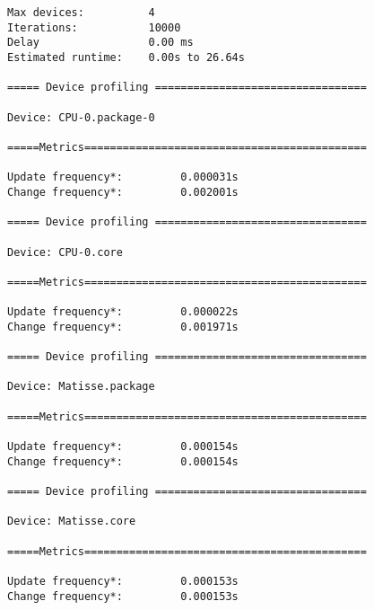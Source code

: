 \begin{verbatim}
Max devices:          4
Iterations:           10000
Delay                 0.00 ms
Estimated runtime:    0.00s to 26.64s

===== Device profiling =================================

Device: CPU-0.package-0

=====Metrics============================================

Update frequency*:         0.000031s
Change frequency*:         0.002001s

===== Device profiling =================================

Device: CPU-0.core

=====Metrics============================================

Update frequency*:         0.000022s
Change frequency*:         0.001971s

===== Device profiling =================================

Device: Matisse.package

=====Metrics============================================

Update frequency*:         0.000154s
Change frequency*:         0.000154s

===== Device profiling =================================

Device: Matisse.core

=====Metrics============================================

Update frequency*:         0.000153s
Change frequency*:         0.000153s
\end{verbatim}
